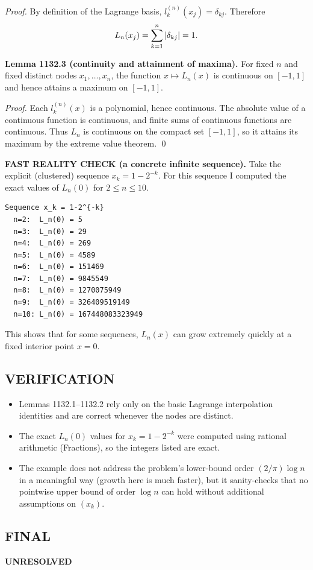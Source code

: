 \emph{Proof.}
By definition of the Lagrange basis, $l_k^{(n)}(x_j)=\delta_{kj}$.
Therefore
\[
L_n(x_j)=\sum_{k=1}^n |\delta_{kj}|=1.
\qedhere
\]

\textbf{Lemma 1132.3 (continuity and attainment of maxima).}
For fixed $n$ and fixed distinct nodes $x_1,\dots,x_n$, the function $x\mapsto L_n(x)$ is continuous on $[-1,1]$ and hence attains a maximum on $[-1,1]$.

\emph{Proof.}
Each $l_k^{(n)}(x)$ is a polynomial, hence continuous. The absolute value of a continuous function is continuous, and finite sums of continuous functions are continuous. Thus $L_n$ is continuous on the compact set $[-1,1]$, so it attains its maximum by the extreme value theorem.
\qed

\textbf{FAST REALITY CHECK (a concrete infinite sequence).}
Take the explicit (clustered) sequence $x_k=1-2^{-k}$.
For this sequence I computed the exact values of $L_n(0)$ for $2\le n\le 10$.
\begin{verbatim}
Sequence x_k = 1-2^{-k}
  n=2:  L_n(0) = 5
  n=3:  L_n(0) = 29
  n=4:  L_n(0) = 269
  n=5:  L_n(0) = 4589
  n=6:  L_n(0) = 151469
  n=7:  L_n(0) = 9845549
  n=8:  L_n(0) = 1270075949
  n=9:  L_n(0) = 326409519149
  n=10: L_n(0) = 167448083323949
\end{verbatim}
This shows that for some sequences, $L_n(x)$ can grow extremely quickly at a fixed interior point $x=0$.

\subsection*{VERIFICATION}
\begin{itemize}
\item Lemmas 1132.1--1132.2 rely only on the basic Lagrange interpolation identities and are correct whenever the nodes are distinct.
\item The exact $L_n(0)$ values for $x_k=1-2^{-k}$ were computed using rational arithmetic (Fractions), so the integers listed are exact.
\item The example does not address the problem's lower-bound order $(2/\pi)\log n$ in a meaningful way (growth here is much faster), but it sanity-checks that no pointwise upper bound of order $\log n$ can hold without additional assumptions on $(x_k)$.
\end{itemize}

\subsection*{FINAL}
\textbf{UNRESOLVED}

